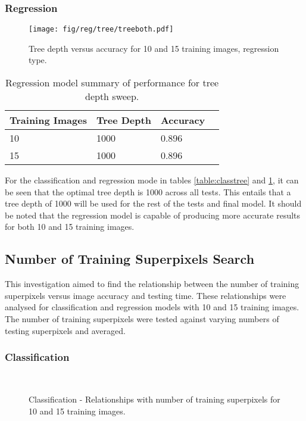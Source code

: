 \subsubsection{Regression}

\begin{figure}[H]
\centering
\texttt{[image: fig/reg/tree/treeboth.pdf]}
\caption{Tree depth versus accuracy for 10 and 15 training images, regression type.}
\label{reg:tree}
\end{figure}

\begin{table}[H]
\centering
\caption{Regression model summary of performance for tree depth sweep.}

\begin{tabular}{|l|l|l|l|}
\hline
 \textbf{Training Images} &	\textbf{Tree Depth} & \textbf{Accuracy}\\
\hline
10 & 1000 & 0.896\\
\hline				    	 			
15 & 1000 & 0.896 \\	
\hline		    	 
\end{tabular}
\label{table:regtree}
\end{table}

For the classification and regression mode in tables \ref{table:classtree} and \ref{table:regtree}, it can be seen that the optimal tree depth is 1000 across all tests. This entails that a tree depth of 1000 will be used for the rest of the tests and final model. It should be noted that the regression model is capable of producing more accurate results for both 10 and 15 training images. 

\subsection{Number of Training Superpixels Search}
\label{res:trainpix}
This investigation aimed to find the relationship between the number of training superpixels versus image accuracy and testing time. These relationships were analysed for classification and regression models with 10 and 15 training images. The number of training superpixels were tested against varying numbers of testing superpixels and averaged. 

\subsubsection{Classification}
\begin{figure}[H]
    \centering
    \\
    \caption{Classification - Relationships with number of training superpixels for 10 and 15 training images.}%
    \label{class:trainpix}
\end{figure}

